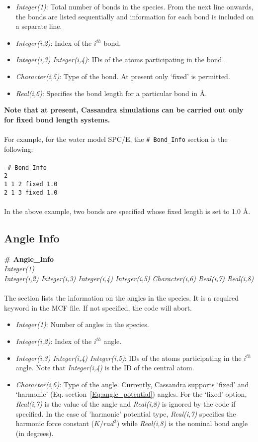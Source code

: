 {{{\begin{itemize}
\item {\it Integer(1)}: Total number of bonds in the species. From the
next line onwards, the bonds are listed sequentially and information
for each bond is included on a separate line.
%
\item {\it Integer(i,2)}:  Index of the $i^{th}$ bond.
%
\item {\it Integer(i,3) Integer(i,4)}: IDs of the atoms participating in
the bond.
%
\item {\it Character(i,5)}: Type of the bond. At present only
`fixed' is  permitted. 
\item {\it Real(i,6)}: Specifies the bond length for a particular bond in \AA.

\end{itemize}
%
{\bf Note that at present, Cassandra simulations can be carried out
  only for fixed bond length systems.} \\ \\
%
For example, for the water model SPC/E, the \texttt{\# Bond\_Info} section is the following: \\ \\
%
\texttt{
\# Bond\_Info \\
2 \\
1    1    2    fixed     1.0 \\
2    1    3    fixed     1.0 \\
} \\
%
In the above example, two bonds are specified whose fixed length is set to 1.0 \AA.

\subsection{Angle Info}\label{sec:Get_Angle_Info}
%
{\bf \# Angle\_Info} \\
%
{\it Integer(1)} \\
%
{\it Integer(i,2) Integer(i,3) Integer(i,4) Integer(i,5)
  Character(i,6) Real(i,7) Real(i,8)} \\ \\
%
The section lists the information on the angles in the species. 
It is a required keyword in the MCF file. If not specified, the code
will abort. \\ 
%
\begin{itemize}
\item {\it Integer(1)}: Number of angles in the species. 
%
\item {\it Integer(i,2)}: Index of the $i^{th}$ angle. 
%
\item {\it Integer(i,3) Integer(i,4) Integer(i,5)}: IDs of the atoms
participating in the $i^{th}$ angle. Note that {\it Integer(i,4)} is
the ID of the central atom.
%
\item {\it Character(i,6)}: Type of the angle. Currently,
Cassandra supports `fixed' and `harmonic' (Eq. section~\ref{Eq:angle_potential})
angles. For the `fixed' option, {\it Real(i,7)} is the value of the
angle and {\it Real(i,8)} is ignored by the code if specified. In the
case of 'harmonic' potential type, {\it Real(i,7)} specifies the
harmonic force constant ($K/rad^2$) while {\it Real(i,8)} is the nominal bond
angle (in degrees).


\end{itemize}}}}

